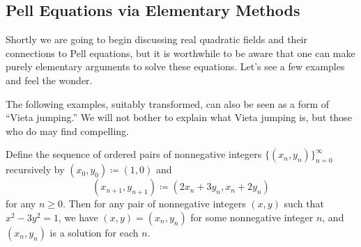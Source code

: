 \documentclass[../notes.tex]{subfiles}
\begin{document}
\subsection{Pell Equations via Elementary Methods}
Shortly we are going to begin discussing real quadratic fields and their connections to Pell equations, but it is worthwhile to be aware that one can make purely elementary arguments to solve these equations. Let's see a few examples and feel the wonder.
\begin{remark}
	The following examples, suitably transformed, can also be seen as a form of ``Vieta jumping.'' We will not bother to explain what Vieta jumping is, but those who do may find  compelling.
\end{remark}
\begin{example} \label{ex:pell-3}
	Define the sequence of ordered pairs of nonnegative integers $\{(x_n,y_n)\}_{n=0}^\infty$ recursively by $(x_0,y_0)\coloneqq(1,0)$ and
	\[(x_{n+1},y_{n+1})\coloneqq(2x_n+3y_n,x_n+2y_n)\]
	for any $n\ge0$. Then for any pair of nonnegative integers $(x,y)$ such that $x^2-3y^2=1$, we have $(x,y)=(x_n,y_n)$ for some nonnegative integer $n$, and $(x_n,y_n)$ is a solution for each $n$.
\end{example}
\end{document}
